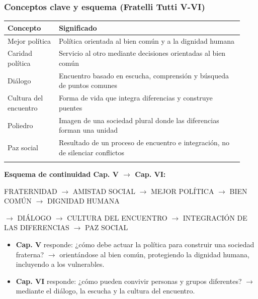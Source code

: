 \documentclass[10pt,a4paper]{article}
\newenvironment{esquema}{\par\medskip\begingroup\small\ttfamily\color{sub}}{\endgroup\medskip}
\begin{document}
\subsubsection{Conceptos clave y esquema (Fratelli Tutti V-VI)}

{\small\renewcommand{\arraystretch}{1.25}
\begin{longtable}{>{\raggedright\arraybackslash}p{0.204\linewidth}>{\raggedright\arraybackslash}p{0.726\linewidth}}
\toprule
\textbf{Concepto} & \textbf{Significado} \\ \midrule \endhead
Mejor política & Política orientada al bien común y a la dignidad humana \\ \addlinespace[2pt]
Caridad política & Servicio al otro mediante decisiones orientadas al bien común \\ \addlinespace[2pt]
Diálogo & Encuentro basado en escucha, comprensión y búsqueda de puntos comunes \\ \addlinespace[2pt]
Cultura del encuentro & Forma de vida que integra diferencias y construye puentes \\ \addlinespace[2pt]
Poliedro & Imagen de una sociedad plural donde las diferencias forman una unidad \\ \addlinespace[2pt]
Paz social & Resultado de un proceso de encuentro e integración, no de silenciar conflictos \\ \addlinespace[2pt]
\bottomrule\end{longtable}}

\medskip\noindent \textbf{Esquema de continuidad Cap. V $\rightarrow$ Cap. VI:}\par\nopagebreak
\begin{esquema}
\noindent\hspace*{0.0em}FRATERNIDAD $\rightarrow$ AMISTAD SOCIAL $\rightarrow$ MEJOR POLÍTICA $\rightarrow$ BIEN COMÚN $\rightarrow$ DIGNIDAD HUMANA\par
\noindent\hspace*{0.0em}$\rightarrow$ DIÁLOGO $\rightarrow$ CULTURA DEL ENCUENTRO $\rightarrow$ INTEGRACIÓN DE LAS DIFERENCIAS $\rightarrow$ PAZ SOCIAL\par
\end{esquema}
\begin{itemize}
\item \textbf{Cap. V} responde: ¿cómo debe actuar la política para construir una sociedad fraterna? $\rightarrow$ orientándose al bien común, protegiendo la dignidad humana, incluyendo a los vulnerables.
\item \textbf{Cap. VI} responde: ¿cómo pueden convivir personas y grupos diferentes? $\rightarrow$ mediante el diálogo, la escucha y la cultura del encuentro.
\end{itemize}
\end{document}
